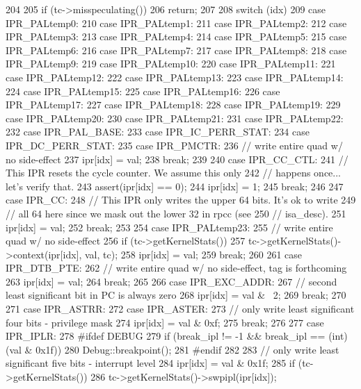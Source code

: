 \begin{DoxyCode}
204 {
205     if (tc->misspeculating())
206         return;
207 
208     switch (idx) {
209       case IPR_PALtemp0:
210       case IPR_PALtemp1:
211       case IPR_PALtemp2:
212       case IPR_PALtemp3:
213       case IPR_PALtemp4:
214       case IPR_PALtemp5:
215       case IPR_PALtemp6:
216       case IPR_PALtemp7:
217       case IPR_PALtemp8:
218       case IPR_PALtemp9:
219       case IPR_PALtemp10:
220       case IPR_PALtemp11:
221       case IPR_PALtemp12:
222       case IPR_PALtemp13:
223       case IPR_PALtemp14:
224       case IPR_PALtemp15:
225       case IPR_PALtemp16:
226       case IPR_PALtemp17:
227       case IPR_PALtemp18:
228       case IPR_PALtemp19:
229       case IPR_PALtemp20:
230       case IPR_PALtemp21:
231       case IPR_PALtemp22:
232       case IPR_PAL_BASE:
233       case IPR_IC_PERR_STAT:
234       case IPR_DC_PERR_STAT:
235       case IPR_PMCTR:
236         // write entire quad w/ no side-effect
237         ipr[idx] = val;
238         break;
239 
240       case IPR_CC_CTL:
241         // This IPR resets the cycle counter.  We assume this only
242         // happens once... let's verify that.
243         assert(ipr[idx] == 0);
244         ipr[idx] = 1;
245         break;
246 
247       case IPR_CC:
248         // This IPR only writes the upper 64 bits.  It's ok to write
249         // all 64 here since we mask out the lower 32 in rpcc (see
250         // isa_desc).
251         ipr[idx] = val;
252         break;
253 
254       case IPR_PALtemp23:
255         // write entire quad w/ no side-effect
256         if (tc->getKernelStats())
257             tc->getKernelStats()->context(ipr[idx], val, tc);
258         ipr[idx] = val;
259         break;
260 
261       case IPR_DTB_PTE:
262         // write entire quad w/ no side-effect, tag is forthcoming
263         ipr[idx] = val;
264         break;
265 
266       case IPR_EXC_ADDR:
267         // second least significant bit in PC is always zero
268         ipr[idx] = val & ~2;
269         break;
270 
271       case IPR_ASTRR:
272       case IPR_ASTER:
273         // only write least significant four bits - privilege mask
274         ipr[idx] = val & 0xf;
275         break;
276 
277       case IPR_IPLR:
278 #ifdef DEBUG
279         if (break_ipl != -1 && break_ipl == (int)(val & 0x1f))
280             Debug::breakpoint();
281 #endif
282 
283         // only write least significant five bits - interrupt level
284         ipr[idx] = val & 0x1f;
285         if (tc->getKernelStats())
286             tc->getKernelStats()->swpipl(ipr[idx]);
}}
\end{DoxyCode}
